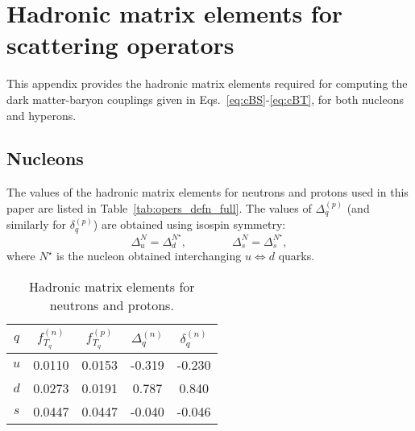 \chapter{Hadronic matrix elements for scattering operators}
\label{appendix:hadronic_matrix_elements}

This appendix provides the hadronic matrix elements required for computing the dark matter-baryon couplings given in Eqs.~\ref{eq:cBS}-\ref{eq:cBT}, for both nucleons and hyperons.


\section{Nucleons}
The values of the hadronic matrix elements for neutrons and protons used in this paper are listed in Table~\ref{tab:opers_defn_full}. The values of $\Delta_q^{(p)}$ (and similarly for $\delta_q^{(p)}$) are obtained using isospin symmetry: 
\begin{equation}
\Delta_u^{N} =\Delta_d^{N^\star},\qquad \qquad
\Delta_s^{N} = \Delta_s^{N^\star},
\end{equation}
where $N^\star$ is the nucleon obtained interchanging $u\Longleftrightarrow d$ quarks.

\begin{table}[th]
    \centering
    \begin{tabular}{|c|c|c|c|c|}
    \hline
     $q$ & $f_{T_q}^{(n)}$ \cite{Belanger:2013oya_MicrOMEGAs3programcalculating} & $f_{T_q}^{(p)}$ \cite{Belanger:2013oya_MicrOMEGAs3programcalculating} & $\Delta^{(n)}_q$ & $\delta^{(n)}_q$ \cite{Belanger:2013oya_MicrOMEGAs3programcalculating} \\ 
     \hline
     $u$  & 0.0110 & 0.0153     & -0.319 \cite{QCDSF:2011aa_Strangenesscontributionproton} & -0.230 \\ \hline
     $d$ & 0.0273  & 0.0191     & 0.787 \cite{QCDSF:2011aa_Strangenesscontributionproton} & 0.840 \\ \hline
     $s$ & 0.0447  & 0.0447     & -0.040 \cite{Dienes:2013xya_Overcomingvelocitysuppression} & -0.046 \\ \hline
    \end{tabular}
    \caption{Hadronic matrix elements for neutrons and protons. }
    \label{tab:hadmatelem}
\end{table}

